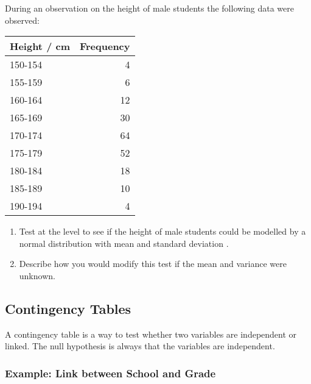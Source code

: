 \documentclass{article}
\begin{document}
During an observation on the height of  male students the
following data were observed:\begin{table}[h!]

    \centering

    \begin{tabular}{lr}

        \toprule

        Height / cm & Frequency \\

        \midrule

        150-154     & 4 \\
        155-159     & 6 \\
        160-164     & 12 \\
        165-169     & 30 \\
        170-174     & 64 \\
        175-179     & 52 \\
        180-184     & 18 \\
        185-189     & 10 \\
        190-194     & 4 \\

        \bottomrule

    \end{tabular}

\end{table}\begin{enumerate}

    \item Test at the  level to see if the height of male
        students could be modelled by a normal distribution with mean
         and standard deviation .

    \item Describe how you would modify this test if the mean and variance were
        unknown.

\end{enumerate}

\subsection{Contingency Tables}

A contingency table is a way to test whether two variables are independent or
linked. The null hypothesis is always that the variables are independent.

\subsubsection[Example]{Example: Link between School and Grade}
\end{document}
